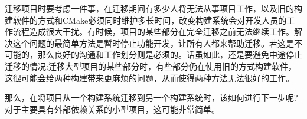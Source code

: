 迁移项目时要考虑一件事，在迁移期间有多少人将无法从事项目工作，以及旧的构建软件的方式和CMake必须同时维护多长时间，改变构建系统会对开发人员的工作流程造成很大干扰。有时候，项目的某些部分在完全迁移之前无法继续工作。解决这个问题的最简单方法是暂时停止功能开发，让所有人都来帮助迁移。若这是不可能的，那么良好的沟通和工作划分则是必须的。话虽如此，还是要避免中途停止迁移的情况:迁移大型项目的某些部分时，有些部分仍在使用旧的方式构建软件，这很可能会给两种构建带来更麻烦的问题，从而使得两种方法无法很好的工作。

那么，在将项目从一个构建系统迁移到另一个构建系统时，该如何进行下一步呢?对于主要具有外部依赖关系的小型项目，这可能非常简单。




















